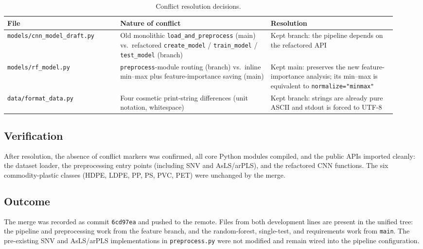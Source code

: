 \documentclass[11pt,a4paper]{article}
\begin{document}
\begin{table}[h]
\centering
\caption{Conflict resolution decisions.}
\label{tab:conflicts}
\small
\begin{tabular}{@{}p{0.27\linewidth} p{0.36\linewidth} p{0.30\linewidth}@{}}
\toprule
\textbf{File} & \textbf{Nature of conflict} & \textbf{Resolution} \\
\midrule
\texttt{models/cnn\_model\_draft.py} &
Old monolithic \texttt{load\_and\_preprocess} (main) vs.\ refactored
\texttt{create\_model} / \texttt{train\_model} / \texttt{test\_model} (branch) &
Kept branch: the pipeline depends on the refactored API \\
\addlinespace
\texttt{models/rf\_model.py} &
\texttt{preprocess}-module routing (branch) vs.\ inline min--max plus
feature-importance saving (main) &
Kept main: preserves the new feature-importance analysis; its min--max is
equivalent to \texttt{normalize="minmax"} \\
\addlinespace
\texttt{data/format\_data.py} &
Four cosmetic print-string differences (unit notation, whitespace) &
Kept branch: strings are already pure ASCII and stdout is forced to UTF-8 \\
\bottomrule
\end{tabular}
\end{table}

\subsection{Verification}

After resolution, the absence of conflict markers was confirmed, all core
Python modules compiled, and the public APIs imported cleanly: the dataset
loader, the preprocessing entry points (including SNV and AsLS/arPLS), and the
refactored CNN functions. The six commodity-plastic classes (HDPE, LDPE, PP,
PS, PVC, PET) were unchanged by the merge.

\subsection{Outcome}

The merge was recorded as commit \texttt{6cd97ea} and pushed to the remote.
Files from both development lines are present in the unified tree: the pipeline
and preprocessing work from the feature branch, and the random-forest,
single-test, and requirements work from \texttt{main}. The pre-existing SNV and
AsLS/arPLS implementations in \texttt{preprocess.py} were not modified and remain
wired into the pipeline configuration.
\end{document}
